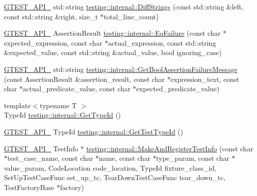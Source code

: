 \begin{DoxyCompactItemize}
\item 
\mbox{\hyperlink{gtest-port_8h_aa73be6f0ba4a7456180a94904ce17790}{G\+T\+E\+S\+T\+\_\+\+A\+P\+I\+\_\+}} std\+::string \mbox{\hyperlink{namespacetesting_1_1internal_a513107ff8defa97d949937fc1350a56c}{testing\+::internal\+::\+Diff\+Strings}} (const std\+::string \&left, const std\+::string \&right, size\+\_\+t $\ast$total\+\_\+line\+\_\+count)
\item 
\mbox{\hyperlink{gtest-port_8h_aa73be6f0ba4a7456180a94904ce17790}{G\+T\+E\+S\+T\+\_\+\+A\+P\+I\+\_\+}} Assertion\+Result \mbox{\hyperlink{namespacetesting_1_1internal_ac61e2ba2cbf259fd6ee5ffd4e49c9445}{testing\+::internal\+::\+Eq\+Failure}} (const char $\ast$expected\+\_\+expression, const char $\ast$actual\+\_\+expression, const std\+::string \&expected\+\_\+value, const std\+::string \&actual\+\_\+value, bool ignoring\+\_\+case)
\item 
\mbox{\hyperlink{gtest-port_8h_aa73be6f0ba4a7456180a94904ce17790}{G\+T\+E\+S\+T\+\_\+\+A\+P\+I\+\_\+}} std\+::string \mbox{\hyperlink{namespacetesting_1_1internal_aed8d3ad4341f8f2de53440e39c995632}{testing\+::internal\+::\+Get\+Bool\+Assertion\+Failure\+Message}} (const Assertion\+Result \&assertion\+\_\+result, const char $\ast$expression\+\_\+text, const char $\ast$actual\+\_\+predicate\+\_\+value, const char $\ast$expected\+\_\+predicate\+\_\+value)
\item 
{\footnotesize template$<$typename T $>$ }\\Type\+Id \mbox{\hyperlink{namespacetesting_1_1internal_a6b108e56fdc68ea937ffb3759fb55ab0}{testing\+::internal\+::\+Get\+Type\+Id}} ()
\item 
\mbox{\hyperlink{gtest-port_8h_aa73be6f0ba4a7456180a94904ce17790}{G\+T\+E\+S\+T\+\_\+\+A\+P\+I\+\_\+}} Type\+Id \mbox{\hyperlink{namespacetesting_1_1internal_a1e85cf16bb95b60f879d48ba1fbfc1c9}{testing\+::internal\+::\+Get\+Test\+Type\+Id}} ()
\item 
\mbox{\hyperlink{gtest-port_8h_aa73be6f0ba4a7456180a94904ce17790}{G\+T\+E\+S\+T\+\_\+\+A\+P\+I\+\_\+}} Test\+Info $\ast$ \mbox{\hyperlink{namespacetesting_1_1internal_adbaeb4f56e1d50cdc1d58c0be1d40527}{testing\+::internal\+::\+Make\+And\+Register\+Test\+Info}} (const char $\ast$test\+\_\+case\+\_\+name, const char $\ast$name, const char $\ast$type\+\_\+param, const char $\ast$value\+\_\+param, Code\+Location code\+\_\+location, Type\+Id fixture\+\_\+class\+\_\+id, Set\+Up\+Test\+Case\+Func set\+\_\+up\+\_\+tc, Tear\+Down\+Test\+Case\+Func tear\+\_\+down\+\_\+tc, Test\+Factory\+Base $\ast$factory)
\item 

\end{DoxyCompactItemize}
